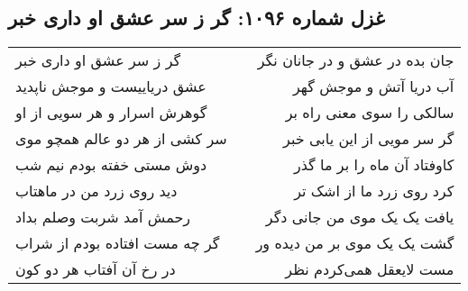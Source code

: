 \begin{center}
\section*{غزل شماره ۱۰۹۶: گر ز سر عشق او داری خبر}
\label{sec:1096}
\begin{longtable}{l p{0.5cm} r}
گر ز سر عشق او داری خبر
&&
جان بده در عشق و در جانان نگر
\\
عشق دریاییست و موجش ناپدید
&&
آب دریا آتش و موجش گهر
\\
گوهرش اسرار و هر سویی از او
&&
سالکی را سوی معنی راه بر
\\
سر کشی از هر دو عالم همچو موی
&&
گر سر مویی از این یابی خبر
\\
دوش مستی خفته بودم نیم شب
&&
کاوفتاد آن ماه را بر ما گذر
\\
دید روی زرد من در ماهتاب
&&
کرد روی زرد ما از اشک تر
\\
رحمش آمد شربت وصلم بداد
&&
یافت یک یک موی من جانی دگر
\\
گر چه مست افتاده بودم از شراب
&&
گشت یک یک موی بر من دیده ور
\\
در رخ آن آفتاب هر دو کون
&&
مست لایعقل همی‌کردم نظر
\\
\end{longtable}
\end{center}
